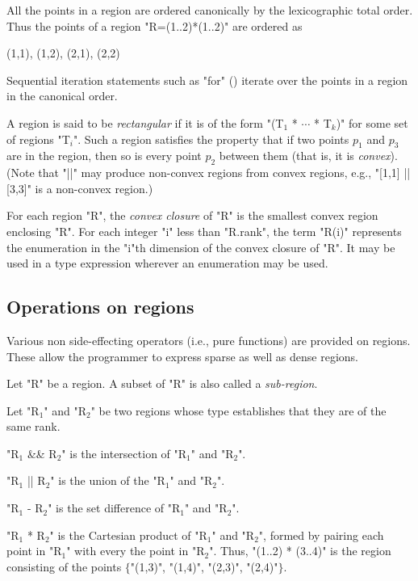 All the points in a region are ordered canonically by the
lexicographic total order. Thus the points of a region \xcd"R=(1..2)*(1..2)"
are ordered as 
\begin{xten}
(1,1), (1,2), (2,1), (2,2)
\end{xten}
Sequential iteration statements such as \xcd"for" ()
iterate over the points in a region in the canonical order.

A region is said to be {\em rectangular} if it is of
the form \xcdmath"(T$_1$ * $\cdots$ * T$_k$)" for some set of regions
\xcdmath"T$_i$". Such a
region satisfies the property that if two points $p_1$ and $p_3$ are
in the region, then so is every point $p_2$ between them (that is, it is {\em convex}). 
(Note that \xcd"||" may produce non-convex regions from convex regions, e.g.,
\xcd"[1,1] || [3,3]" is a non-convex region.)

For each region \xcd"R", the {\em convex closure} of \xcd"R" is the
smallest convex region enclosing \xcd"R".  For each integer \xcd"i"
less than \xcd"R.rank", the term \xcd"R(i)" represents the enumeration
in the \xcd"i"th dimension of the convex closure of \xcd"R". It may be
used in a type expression wherever an enumeration may be used.

\subsection{Operations on regions}
Various non side-effecting operators (i.e., pure functions) are
provided on regions. These allow the programmer to express sparse as
well as dense regions.

Let \xcd"R" be a region. A subset of \xcd"R" is also called a
{\em sub-region}.

Let \xcdmath"R$_1$" and \xcdmath"R$_2$" be two regions whose type
establishes that they are of the same rank.

\xcdmath"R$_1$ && R$_2$" is the intersection of \xcdmath"R$_1$" and
\xcdmath"R$_2$". 


\xcdmath"R$_1$ || R$_2$" is the union of the \xcdmath"R$_1$" and
\xcdmath"R$_2$".

\xcdmath"R$_1$ - R$_2$" is the set difference of \xcdmath"R$_1$" and
\xcdmath"R$_2$".

\xcdmath"R$_1$ * R$_2$" is the Cartesian product of \xcdmath"R$_1$" and
\xcdmath"R$_2$", 
formed by pairing each point in \xcdmath"R$_1$"
with every the point in \xcdmath"R$_2$".
Thus, \xcd"(1..2) * (3..4)"
is the region consisting of the points
$\{$\xcd"(1,3)", \xcd"(1,4)", \xcd"(2,3)", \xcd"(2,4)"$\}$.

